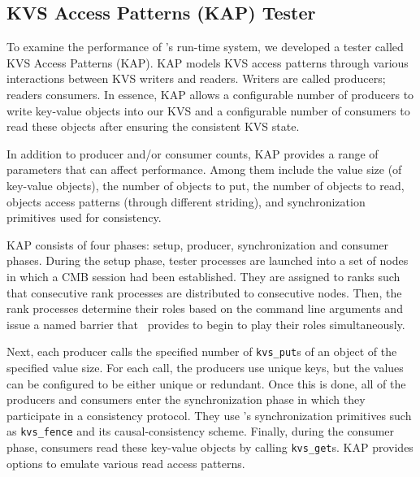 \subsection{KVS Access Patterns (KAP) Tester}
To examine the performance of \flux's run-time system,
we developed a tester called KVS Access Patterns (KAP).
KAP models KVS access patterns through various interactions
between KVS writers and readers. Writers are called producers;
readers consumers.
In essence, KAP allows a configurable number of producers
to write key-value objects into our KVS 
and a configurable number of consumers to read these
objects after ensuring the consistent KVS state.

In addition to producer and/or consumer counts,
KAP provides a range of parameters that can affect performance.
Among them include the value size (of key-value objects),
the number of objects to put,
the number of objects to read, objects access 
patterns (through different striding), and
synchronization primitives used for consistency.

KAP consists of four phases: setup, producer, synchronization 
and consumer phases. 
During the setup phase, tester processes are launched 
into a set of nodes in which a CMB session had been established.
They are assigned to ranks such that consecutive rank
processes are distributed to consecutive nodes.
Then, the rank processes determine their roles based
on the command line arguments and issue a named barrier
that \flux\ provides to begin to play their roles
simultaneously.

Next, each producer calls the specified number of
{\tt kvs\_put}s of an object of the specified value size.
For each call, the producers use unique keys, but
the values can be configured to be either unique
or redundant.
Once this is done, all of the producers and consumers
enter the synchronization phase in which they 
participate in a consistency protocol. They use
\flux's synchronization primitives such as {\tt kvs\_fence}
and its causal-consistency scheme.
Finally, during the consumer phase, consumers read
these key-value objects by calling {\tt kvs\_get}s.
KAP provides options to emulate various read access
patterns.

